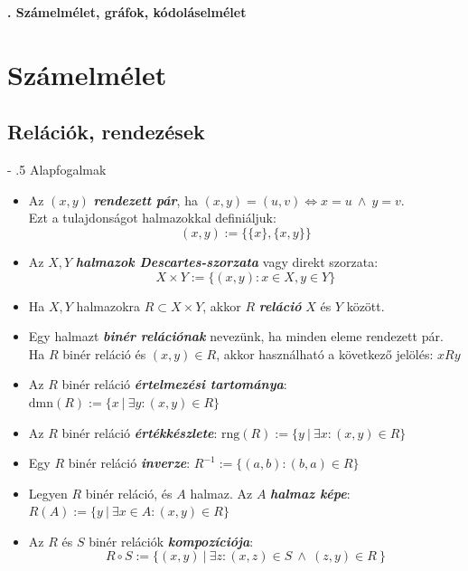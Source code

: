 \documentclass[12pt,margin=0px]{article}
\makeatletter
\renewcommand\paragraph{%
	\@startsection{paragraph}{4}{0mm}%
	{-\baselineskip}%
	{.5\baselineskip}%
	{\normalfont\normalsize\bfseries}}
\makeatother
\begin{document}
    \thispagestyle{fancy}

    \begin{center}
        {\Large\bfseries{}. Számelmélet, gráfok, kódoláselmélet} \\
    \end{center}

    \section*{Számelmélet}

    \subsection*{Relációk, rendezések\\}
			
	\paragraph{Alapfogalmak}

    \begin{itemize}[leftmargin=5.5mm]
        \renewcommand{\labelitemi}{$\vcenter{\hbox{\tiny$\bullet$}}$}
        \item Az $(x,y)$ \emph{\textbf{rendezett pár}}, ha $(x,y) = (u,v) \Longleftrightarrow x = u \ \land \ y = v$.\\
        Ezt a tulajdonságot halmazokkal definiáljuk:
        \[
            (x,y) := \{ \{x\}, \{x, y\} \}
        \]
        \item Az $X,Y$ \textbf{\emph{halmazok Descartes-szorzata}} vagy direkt szorzata:
        \[
            X \times Y := \{ (x,y) : x \in X, y \in Y \}
        \]
        \item Ha $X, Y$ halmazokra $R \subset X\times Y$, akkor $R$ \emph{\textbf{reláció}} $X$ és $Y$ között.
        \item Egy halmazt \emph{\textbf{binér relációnak}} nevezünk, ha minden eleme rendezett pár.\\
        	Ha $R$ binér reláció és $(x,y) \in R$, akkor használható a következő jelölés: $xRy$
        \item Az $R$ binér reláció \emph{\textbf{értelmezési tartománya}}: $\textrm{dmn}(R) := \{ x\  | \ \exists y : (x,y)\in R  \}$
        \item Az $R$ binér reláció \emph{\textbf{értékkészlete}}: $\textrm{rng}(R) := \{ y\  | \ \exists x : (x,y)\in R  \}$
        \item Egy $R$ binér reláció \emph{\textbf{inverze}}: $R^{-1} := \{(a,b) : (b,a) \in R\}$
        \item Legyen $R$ binér reláció, és $A$ halmaz. Az $A$ \emph{\textbf{halmaz képe}}: $R(A) := \{y \ | \ \exists x\in A: (x,y) \in R\}$
        \item Az $R$ és $S$ binér relációk \emph{\textbf{kompozíciója}}:
        \[
            R \circ S := \{ (x,y) \ | \ \exists z : (x,z) \in S \ \land \ (z,y) \in R \ \}
        \]
    \end{itemize}
\end{document}
